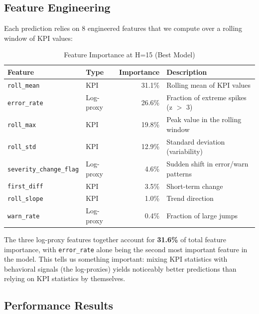 \documentclass[11pt,a4paper]{article}
\begin{document}
\subsection{Feature Engineering}

Each prediction relies on 8 engineered features that we compute over a rolling window of KPI values:

\begin{table}[H]
\centering
\begin{tabular}{llrl}
\toprule
\textbf{Feature} & \textbf{Type} & \textbf{Importance} & \textbf{Description} \\
\midrule
\texttt{roll\_mean} & KPI & 31.1\% & Rolling mean of KPI values \\
\texttt{error\_rate} & Log-proxy & 26.6\% & Fraction of extreme spikes (z $>$ 3) \\
\texttt{roll\_max} & KPI & 19.8\% & Peak value in the rolling window \\
\texttt{roll\_std} & KPI & 12.9\% & Standard deviation (variability) \\
\texttt{severity\_change\_flag} & Log-proxy & 4.6\% & Sudden shift in error/warn patterns \\
\texttt{first\_diff} & KPI & 3.5\% & Short-term change \\
\texttt{roll\_slope} & KPI & 1.0\% & Trend direction \\
\texttt{warn\_rate} & Log-proxy & 0.4\% & Fraction of large jumps \\
\bottomrule
\end{tabular}
\caption{Feature Importance at H=15 (Best Model)}
\label{tab:feature-importance}
\end{table}

\begin{infobox}
The three log-proxy features together account for \textbf{31.6\%} of total feature importance, with \texttt{error\_rate} alone being the second most important feature in the model. This tells us something important: mixing KPI statistics with behavioral signals (the log-proxies) yields noticeably better predictions than relying on KPI statistics by themselves.
\end{infobox}

\subsection{Performance Results}
\end{document}
